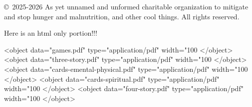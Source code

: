 \documentclass[12pt,letterpaper]{book}
\begin{document}


\copyright\ 2025-2026 As yet unnamed and unformed charitable organization to mitigate and stop hunger and malnutrition, and other cool things. All rights reserved.

\begin{htmlonly}
  Here is an html only portion!!!
\end{htmlonly}

\tableofcontents







\begin{htmlonly}
  
<object data="games.pdf" type="application/pdf" width="100%
</object>
<object data="three-story.pdf" type="application/pdf" width="100%
</object>
<object data="cards-emental-physical.pdf" type="application/pdf" width="100%
</object>
<object data="cards-spiritual.pdf" type="application/pdf" width="100%
</object>
<object data="four-story.pdf" type="application/pdf" width="100%
</object>

\end{htmlonly}
\end{document}
